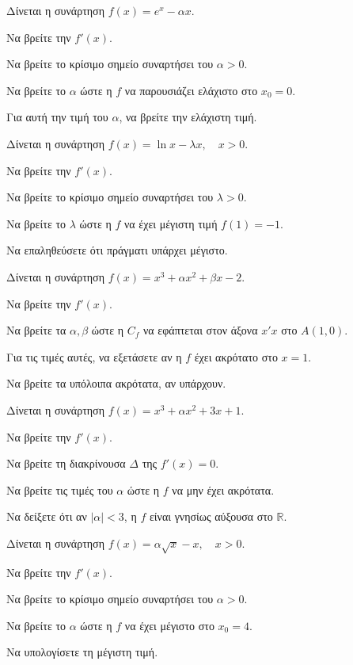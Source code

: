 \documentclass[11pt,a4paper,modern]{FFExercises}
\begin{document}
\askhsh
Δίνεται η συνάρτηση $f(x) = e^x - \alpha x$.
\begin{alist}
    \item Να βρείτε την $f'(x)$.
    \item Να βρείτε το κρίσιμο σημείο συναρτήσει του $\alpha > 0$.
    \item Να βρείτε το $\alpha$ ώστε η $f$ να παρουσιάζει ελάχιστο στο $x_0 = 0$.
    \item Για αυτή την τιμή του $\alpha$, να βρείτε την ελάχιστη τιμή.
\end{alist}

\askhsh
Δίνεται η συνάρτηση $f(x) = \ln x - \lambda x, \quad x > 0$.
\begin{alist}
    \item Να βρείτε την $f'(x)$.
    \item Να βρείτε το κρίσιμο σημείο συναρτήσει του $\lambda > 0$.
    \item Να βρείτε το $\lambda$ ώστε η $f$ να έχει μέγιστη τιμή $f(1) = -1$.
    \item Να επαληθεύσετε ότι πράγματι υπάρχει μέγιστο.
\end{alist}

\askhsh
Δίνεται η συνάρτηση $f(x) = x^3 + \alpha x^2 + \beta x - 2$.
\begin{alist}
    \item Να βρείτε την $f'(x)$.
    \item Να βρείτε τα $\alpha, \beta$ ώστε η $C_f$ να εφάπτεται στον άξονα $x'x$ στο $A(1, 0)$.
    \item Για τις τιμές αυτές, να εξετάσετε αν η $f$ έχει ακρότατο στο $x = 1$.
    \item Να βρείτε τα υπόλοιπα ακρότατα, αν υπάρχουν.
\end{alist}

\askhsh
Δίνεται η συνάρτηση $f(x) = x^3 + \alpha x^2 + 3x + 1$.
\begin{alist}
    \item Να βρείτε την $f'(x)$.
    \item Να βρείτε τη διακρίνουσα $\Delta$ της $f'(x) = 0$.
    \item Να βρείτε τις τιμές του $\alpha$ ώστε η $f$ να μην έχει ακρότατα.
    \item Να δείξετε ότι αν $|\alpha| < 3$, η $f$ είναι γνησίως αύξουσα στο $\mathbb{R}$.
\end{alist}

\askhsh
Δίνεται η συνάρτηση $f(x) = \alpha \sqrt{x} - x, \quad x > 0$.
\begin{alist}
    \item Να βρείτε την $f'(x)$.
    \item Να βρείτε το κρίσιμο σημείο συναρτήσει του $\alpha > 0$.
    \item Να βρείτε το $\alpha$ ώστε η $f$ να έχει μέγιστο στο $x_0 = 4$.
    \item Να υπολογίσετε τη μέγιστη τιμή.
\end{alist}
\end{document}
